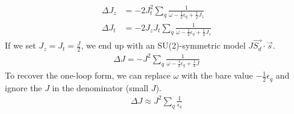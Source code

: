 \documentclass[12pt,twoside]{report}
\numberwithin{equation}{section}
\begin{document}
\begin{equation}\begin{aligned}
	\Delta J_z &= - 2J_t^2 \sum_q \frac{1}{\omega - \frac{1}{2}\epsilon_q+ \frac{1}{2}J_z}\\
	\Delta J_t &= -2J_z J_t \sum_q\frac{1}{\omega - \frac{1}{2}\epsilon_q+ \frac{1}{2}J_z }
\end{aligned}\end{equation}
If we set \(J_z = J_t = \frac{J}{2}\), we end up with an SU(2)-symmetric model \(J \vec{S_d}\cdot\vec{s}\).
\begin{equation}\begin{aligned}
	\label{kondosym}
	\Delta J = - J^2 \sum_q \frac{1}{\omega - \frac{1}{2}\epsilon_q+ \frac{1}{4}J}
\end{aligned}\end{equation}
To recover the one-loop form, we can replace \(\omega\) with the bare value \(-\frac{1}{2}\epsilon_q\) and ignore the \(J\) in the denominator (small \(J\)).
\begin{equation}\begin{aligned}
	\Delta J \approx J^2 \sum_q \frac{1}{\epsilon_q}
\end{aligned}\end{equation}
\end{document}
